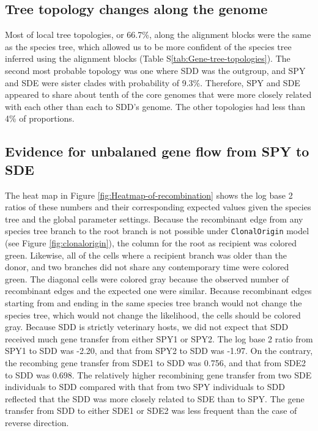 \documentclass[english]{article}
\begin{document}
\subsection{Tree topology changes along the genome}
Most of local tree topologies, or 66.7\%, along the alignment blocks were the
same as the species tree, which allowed us to be more confident of the species
tree inferred using the alignment blocks (Table
S\ref{tab:Gene-tree-topologies}).  The second most probable topology was one
where SDD was the outgroup, and SPY and SDE were sister clades with probability
of 9.3\%.  Therefore, SPY and SDE appeared to share about tenth of the core
genomes that were more closely related with each other than each to SDD's
genome. The other topologies had less than 4\% of proportions.

\subsection{Evidence for unbalaned gene flow from SPY to SDE}
The heat map in Figure \ref{fig:Heatmap-of-recombination} shows the log base 2
ratios of these numbers and their corresponding expected values given the
species tree and the global parameter settings.  Because the recombinant edge
from any species tree branch to the root branch is not possible under
\texttt{ClonalOrigin} model (see Figure \ref{fig:clonalorigin}), the column for
the root as recipient was colored green. Likewise, all of the cells where a
recipient branch was older than the donor, and two branches did not share any
contemporary time were colored green. The diagonal cells were colored gray
because the observed number of recombinant edges and the expected one were
similar. Because recombinant edges starting from and ending in the same species
tree branch would not change the species tree, which would not change the
likelihood, the cells should be colored gray.  Because SDD is strictly
veterinary hosts, we did not expect that SDD received much gene transfer from
either SPY1 or SPY2.  The log base 2 ratio from SPY1 to SDD was -2.20, and that
from SPY2 to SDD was -1.97. On the contrary, the recombing gene transfer from
SDE1 to SDD was 0.756, and that from SDE2 to SDD was 0.698. The relatively
higher recombining gene transfer from two SDE individuals to SDD compared with
that from two SPY individuals to SDD reflected that the SDD was more closely
related to SDE than to SPY.  The gene transfer from SDD to either SDE1 or SDE2
was less frequent than the case of reverse direction. 
\end{document}
